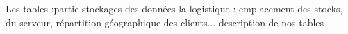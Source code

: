 Les tables :partie stockages des données
la logistique : emplacement des stocks, du serveur, répartition géographique des clients...
description de nos tables